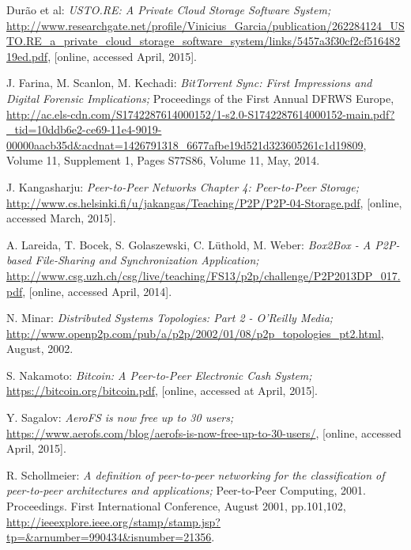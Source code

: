 \begin{thebibliography}{99}

		Dur\~ao et al:
		\emph{USTO.RE: A Private Cloud Storage Software System;}
		\url{http://www.researchgate.net/profile/Vinicius_Garcia/publication/262284124_USTO.RE_a_private_cloud_storage_software_system/links/5457a3f30cf2cf51648219ed.pdf},
		[online, accessed April, 2015].
		
		J. Farina, M. Scanlon, M. Kechadi:
		\emph{BitTorrent Sync: First Impressions and Digital Forensic Implications;}
		Proceedings of the First Annual DFRWS Europe,
		\url{http://ac.els-cdn.com/S1742287614000152/1-s2.0-S1742287614000152-main.pdf?_tid=10ddb6e2-ce69-11e4-9019-00000aacb35d&acdnat=1426791318_6677afbe19d521d323605261c1d19809},
		Volume 11, Supplement 1, Pages S77\textendash S86, Volume 11, May, 2014.

		J. Kangasharju:
		\emph{Peer-to-Peer Networks Chapter 4: Peer-to-Peer Storage;}
		\url{http://www.cs.helsinki.fi/u/jakangas/Teaching/P2P/P2P-04-Storage.pdf},
		[online, accessed March, 2015].
		
		A. Lareida, T. Bocek, S. Golaszewski, C. L\"uthold, M. Weber:
		\emph{Box2Box - A P2P-based File-Sharing and Synchronization Application;}
		\url{http://www.csg.uzh.ch/csg/live/teaching/FS13/p2p/challenge/P2P2013DP_017.pdf},
		[online, accessed April, 2014].

		N. Minar:
		\emph{Distributed Systems Topologies: Part 2 - O'Reilly Media;}
		\url{http://www.openp2p.com/pub/a/p2p/2002/01/08/p2p_topologies_pt2.html},
		August, 2002.

		S. Nakamoto:
		\emph{Bitcoin: A Peer-to-Peer Electronic Cash System;}
		\url{https://bitcoin.org/bitcoin.pdf},
		[online, accessed at April, 2015].

		Y. Sagalov:
		\emph{AeroFS is now free up to 30 users;}
		\url{https://www.aerofs.com/blog/aerofs-is-now-free-up-to-30-users/},
		[online, accessed April, 2015].

		R. Schollmeier:
		\emph{A definition of peer-to-peer networking for the classification of peer-to-peer architectures and applications;}
		Peer-to-Peer Computing, 2001. Proceedings. First International Conference,
		August 2001,
		pp.101,102,
		\url{http://ieeexplore.ieee.org/stamp/stamp.jsp?tp=&arnumber=990434&isnumber=21356}.


\end{thebibliography}
